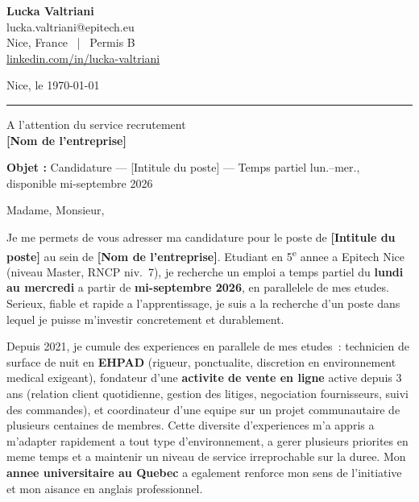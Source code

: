 \documentclass[11pt,a4paper]{article}
\newcommand{\myphone}{}
\newcommand{\entreprise}{[Nom de l'entreprise]}
\newcommand{\poste}{[Intitule du poste]}
\begin{document}
\begin{minipage}[t]{0.55\linewidth}
  {\large\bfseries\color{accent} Lucka Valtriani}\\[2pt]
  {\small\color{gray}
    \myphone{}lucka.valtriani@epitech.eu\\
    Nice, France ~|~ Permis B\\
    \href{https://www.linkedin.com/in/lucka-valtriani-8a8551258/}{linkedin.com/in/lucka-valtriani}
  }
\end{minipage}
\hfill
\begin{minipage}[t]{0.38\linewidth}
  \raggedleft
  {\small\color{gray} Nice, le \today}
\end{minipage}

\vspace{0.5pt}
{\color{accent}\rule{\linewidth}{0.6pt}}
\vspace{14pt}

{\small\color{gray}
  A l'attention du service recrutement\\
  \textbf{\entreprise}
}

\vspace{14pt}

\noindent\textbf{Objet :} Candidature --- \poste{} --- Temps partiel lun.--mer., disponible mi-septembre 2026

\vspace{18pt}

Madame, Monsieur,

\vspace{4pt}

Je me permets de vous adresser ma candidature pour le poste de \textbf{\poste} au sein de \textbf{\entreprise}. Etudiant en 5\textsuperscript{e} annee a Epitech Nice (niveau Master, RNCP niv.~7), je recherche un emploi a temps partiel du \textbf{lundi au mercredi} a partir de \textbf{mi-septembre 2026}, en parallelele de mes etudes. Serieux, fiable et rapide a l'apprentissage, je suis a la recherche d'un poste dans lequel je puisse m'investir concretement et durablement.

Depuis 2021, je cumule des experiences en parallele de mes etudes~: technicien de surface de nuit en \textbf{EHPAD} (rigueur, ponctualite, discretion en environnement medical exigeant), fondateur d'une \textbf{activite de vente en ligne} active depuis 3 ans (relation client quotidienne, gestion des litiges, negociation fournisseurs, suivi des commandes), et coordinateur d'une equipe sur un projet communautaire de plusieurs centaines de membres. Cette diversite d'experiences m'a appris a m'adapter rapidement a tout type d'environnement, a gerer plusieurs priorites en meme temps et a maintenir un niveau de service irreprochable sur la duree. Mon \textbf{annee universitaire au Quebec} a egalement renforce mon sens de l'initiative et mon aisance en anglais professionnel.
\end{document}
